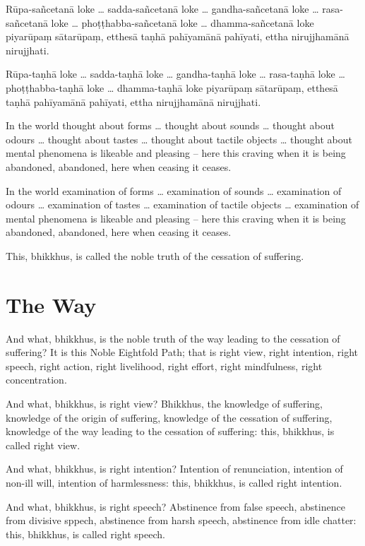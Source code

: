 Rūpa-sañcetanā loke \ldots{} sadda-sañcetanā loke \ldots{} gandha-sañcetanā loke
\ldots{} rasa-sañcetanā loke \ldots{} phoṭṭhabba-sañcetanā loke \ldots{}
dhamma-sañcetanā loke piyarūpaṃ sātarūpaṃ, etthesā taṇhā pahīyamānā pahīyati,
ettha nirujjhamānā nirujjhati.

Rūpa-taṇhā loke \ldots{} sadda-taṇhā loke \ldots{} gandha-taṇhā loke \ldots{}
rasa-taṇhā loke \ldots{} phoṭṭhabba-taṇhā loke \ldots{} dhamma-taṇhā loke piyarūpaṃ
sātarūpaṃ, etthesā taṇhā pahīyamānā pahīyati, ettha nirujjhamānā nirujjhati.

\englishPage

In the world thought about forms \ldots{} thought about sounds \ldots{} thought
about odours \ldots{} thought about tastes \ldots{} thought about tactile
objects \ldots{} thought about mental phenomena is likeable and pleasing -- here
this craving when it is being abandoned, abandoned, here when ceasing it ceases.

In the world examination of forms \ldots{} examination of sounds \ldots{}
examination of odours \ldots{} examination of tastes \ldots{} examination of
tactile objects \ldots{} examination of mental phenomena is likeable and
pleasing -- here this craving when it is being abandoned, abandoned, here when
ceasing it ceases.

This, bhikkhus, is called the noble truth of the cessation of suffering.

\section{The Way}

And what, bhikkhus, is the noble truth of the way leading to the cessation of
suffering? It is this Noble Eightfold Path; that is right view, right intention,
right speech, right action, right livelihood, right effort, right mindfulness,
right concentration.

And what, bhikkhus, is right view? Bhikkhus, the knowledge of suffering,
knowledge of the origin of suffering, knowledge of the cessation of suffering,
knowledge of the way leading to the cessation of suffering: this, bhikkhus, is
called right view.

And what, bhikkhus, is right intention? Intention of renunciation, intention of
non-ill will, intention of harmlessness: this, bhikkhus, is called right
intention.

And what, bhikkhus, is right speech? Abstinence from false speech, abstinence
from divisive sppech, abstinence from harsh speech, abstinence from idle
chatter: this, bhikkhus, is called right speech.

